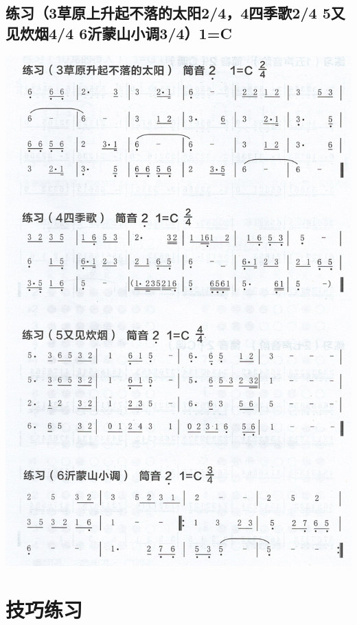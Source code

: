 \documentclass[cn,pad,chinese,chinesefont=nofont]{elegantbook}
\begin{document}
\section{练习（3草原上升起不落的太阳2/4，4四季歌2/4 5又见炊烟4/4 6沂蒙山小调3/4）1=C}
\includegraphics[height=\textheight]{dongxiao/Scan 6.jpeg}

\chapter{技巧练习}
\end{document}
